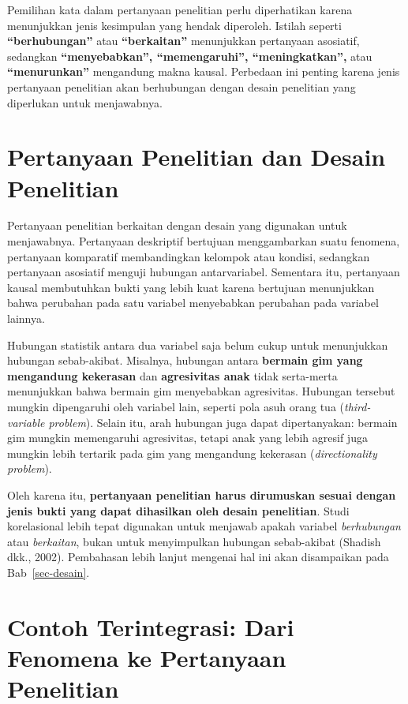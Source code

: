 \documentclass[
  indonesian,
  letterpaper,
  DIV=11,
  numbers=noendperiod]{scrreprt}
\begin{document}
Pemilihan kata dalam pertanyaan penelitian perlu diperhatikan karena
menunjukkan jenis kesimpulan yang hendak diperoleh. Istilah seperti
\textbf{``berhubungan''} atau \textbf{``berkaitan''} menunjukkan
pertanyaan asosiatif, sedangkan \textbf{``menyebabkan'',
``memengaruhi'', ``meningkatkan'',} atau \textbf{``menurunkan''}
mengandung makna kausal. Perbedaan ini penting karena jenis pertanyaan
penelitian akan berhubungan dengan desain penelitian yang diperlukan
untuk menjawabnya.

\section{Pertanyaan Penelitian dan Desain
Penelitian}\label{pertanyaan-penelitian-dan-desain-penelitian}

Pertanyaan penelitian berkaitan dengan desain yang digunakan untuk
menjawabnya. Pertanyaan deskriptif bertujuan menggambarkan suatu
fenomena, pertanyaan komparatif membandingkan kelompok atau kondisi,
sedangkan pertanyaan asosiatif menguji hubungan antarvariabel. Sementara
itu, pertanyaan kausal membutuhkan bukti yang lebih kuat karena
bertujuan menunjukkan bahwa perubahan pada satu variabel menyebabkan
perubahan pada variabel lainnya.

Hubungan statistik antara dua variabel saja belum cukup untuk
menunjukkan hubungan sebab-akibat. Misalnya, hubungan antara
\textbf{bermain gim yang mengandung kekerasan} dan \textbf{agresivitas
anak} tidak serta-merta menunjukkan bahwa bermain gim menyebabkan
agresivitas. Hubungan tersebut mungkin dipengaruhi oleh variabel lain,
seperti pola asuh orang tua (\emph{third-variable problem}). Selain itu,
arah hubungan juga dapat dipertanyakan: bermain gim mungkin memengaruhi
agresivitas, tetapi anak yang lebih agresif juga mungkin lebih tertarik
pada gim yang mengandung kekerasan (\emph{directionality problem}).

Oleh karena itu, \textbf{pertanyaan penelitian harus dirumuskan sesuai
dengan jenis bukti yang dapat dihasilkan oleh desain penelitian}. Studi
korelasional lebih tepat digunakan untuk menjawab apakah variabel
\emph{berhubungan} atau \emph{berkaitan}, bukan untuk menyimpulkan
hubungan sebab-akibat (Shadish dkk., 2002). Pembahasan lebih lanjut
mengenai hal ini akan disampaikan pada Bab~\ref{sec-desain}.

\section{Contoh Terintegrasi: Dari Fenomena ke Pertanyaan
Penelitian}\label{contoh-terintegrasi-dari-fenomena-ke-pertanyaan-penelitian}
\end{document}
